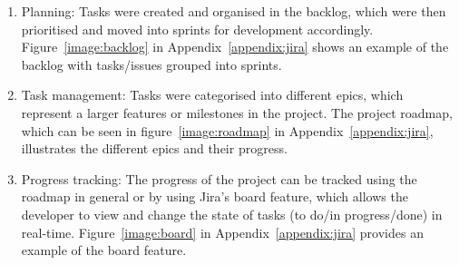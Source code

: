 \begin{enumerate}
  \item Planning: Tasks were created and organised in the backlog, which were then prioritised and moved into sprints for development accordingly. Figure~\ref{image:backlog} in Appendix~\ref{appendix:jira} shows an example of the backlog with tasks/issues grouped into sprints.
  \item Task management: Tasks were  categorised into different epics, which represent a larger features or milestones in the project. The project roadmap, which can be seen in figure~\ref{image:roadmap} in Appendix~\ref{appendix:jira}, illustrates the different epics and their progress.
  \item Progress tracking: The progress of the project can be tracked using the roadmap in general or by using Jira's board feature, which allows the developer to view and change the state of tasks (to do/in progress/done) in real-time. Figure~\ref{image:board} in Appendix~\ref{appendix:jira} provides an example of the board feature. 
\end{enumerate}
